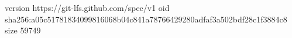 version https://git-lfs.github.com/spec/v1
oid sha256:a05c51781834099816068b04c841a78766429280adfaf3a502bdf28c1f3884c8
size 59749
